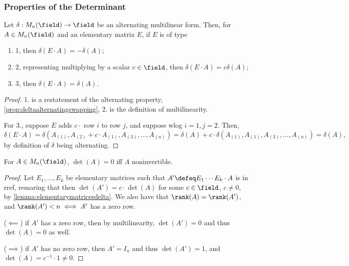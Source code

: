 \subsubsection{Properties of the Determinant}

\begin{lemma}\label{lemma:elementarymatricesdelta}
Let $\delta : M_n(\field) \to \field$ be an alternating multilinear form. Then, for $A \in M_n(\field)$ and an elementary matrix $E$, if $E$ is of type 
\begin{enumerate}
    \item 1, then $\delta(E \cdot A) = - \delta(A)$;
    \item 2, representing multiplying by a scalar $c \in \field$, then $\delta(E \cdot A) = c \delta(A)$;
    \item 3, then $\delta(E \cdot A) = \delta(A)$.
\end{enumerate}
\end{lemma}

\begin{proof}
    1. is a restatement of the alternating property, \cref{prop:deltaalternatingswapping}, 2. is the definition of multilinearity.

    For 3., suppose $E$ adds $c \cdot $ row $i$ to row $j$, and suppose wlog $i = 1, j = 2$. Then, \[
    \delta(E \cdot A) = \delta(A_{(1)}, A_{(2)} + c \cdot A_{(1)}, A_{(3)}, \dots, A_{(n)})  = \delta(A) + c \cdot \delta(A_{(1)}, A_{(1)}, A_{(3)}, \dots, A_{(n)}) = \delta(A),
    \]
    by definition of $\delta$ being alternating.
\end{proof}

\begin{theorem}\label{thm:determinantinvertibility}
For $A \in M_n(\field)$, $\det(A) = 0$ iff $A$ noninvertible.
\end{theorem}

\begin{proof}
    Let $E_1, \dots, E_k$ be elementary matrices such that $A' \defeq E_1 \cdots E_k \cdot A$ is in rref, remaring that then $\det(A') = c \cdot \det(A)$ for some $c \in \field$, $c \neq 0$, by \cref{lemma:elementarymatricesdelta}. We also have that $\rank(A) = \rank(A')$, and $\rank(A') < n \iff A'$ has a zero row. 

    ($\impliedby$) if $A'$ has a zero row, then by multilinearity, $\det(A') = 0$ and thus $\det(A) = 0$ as well.

    ($\implies$) if $A'$ has no zero row, then $A' = I_n$ and thus $\det(A') = 1$, and $\det(A) = c^{-1} \cdot 1 \neq 0$.
\end{proof}

